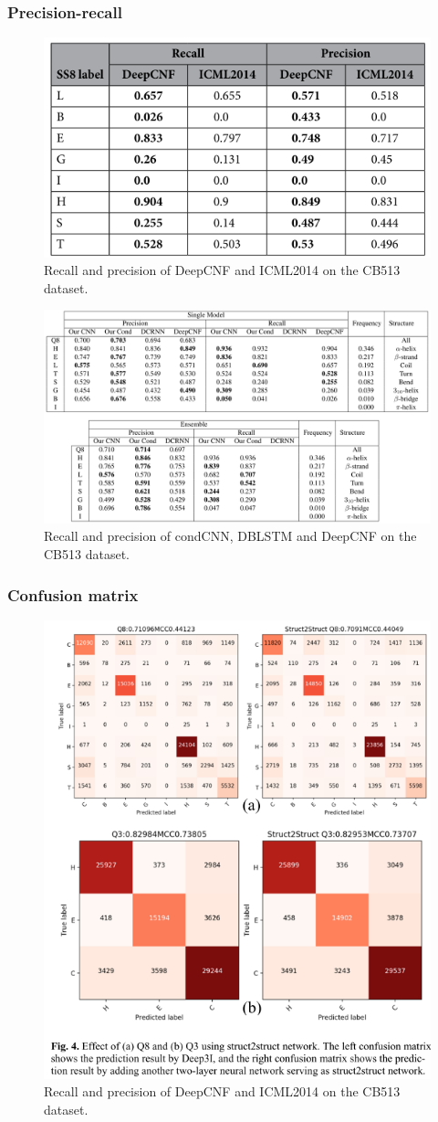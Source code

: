 \documentclass[]{scrartcl}
\begin{document}
\subsubsection{Precision-recall}
\begin{figure}[h]
	\centering
	\includegraphics[width=0.7\linewidth]{prere}
	\caption{Recall and precision of DeepCNF and ICML2014 on the CB513 dataset.}
\end{figure}
\begin{figure}[h]
	\centering
	\includegraphics[width=1\linewidth]{precrec}
	\caption{Recall and precision of condCNN, DBLSTM and DeepCNF on the CB513 dataset.}
\end{figure}
\subsubsection{Confusion matrix}
\begin{figure}[h]
	\centering
	\includegraphics[width=0.7\linewidth]{confmat}
	\caption{Recall and precision of DeepCNF and ICML2014 on the CB513 dataset.}
\end{figure}
\end{document}
